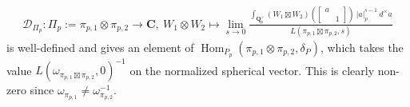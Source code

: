 \documentclass{amsart}%
\theoremstyle{plain}
\theoremstyle{plain}
\theoremstyle{remark}
\DeclareMathOperator{\Hom}{Hom}
\begin{document}
\begin{align}\label{eq: explicit P-invariant period}\mathscr{D}_{\Pi_p}:\Pi_p:=\pi_{p,1}\otimes \pi_{p,2}\longrightarrow\mathbf{C},\ W_1\otimes W_2\mapsto \lim_{s\rightarrow 0}\frac{\int_{\mathbf{Q}_p^\times}\left(W_1\boxtimes W_2\right)(\left[\begin{smallmatrix}
            a & \\
            & 1
        \end{smallmatrix}\right])\ |a|_p^{s-1}\ d^\times a}{L(\pi_{p,1}\boxtimes\pi_{p,2},s)}\end{align}
is well-defined and gives an element of $\Hom_{P_p}(\pi_{p,1}\otimes \pi_{p,2},\delta_P)$, which takes the value $L(\omega_{\pi_{p,1}\boxtimes \pi_{p,2}},0)^{-1}$ on the normalized spherical vector. This is clearly non-zero since $\omega_{\pi_{p,1}}\neq \omega_{\pi_{p,2}}^{-1}$.
\end{document}
